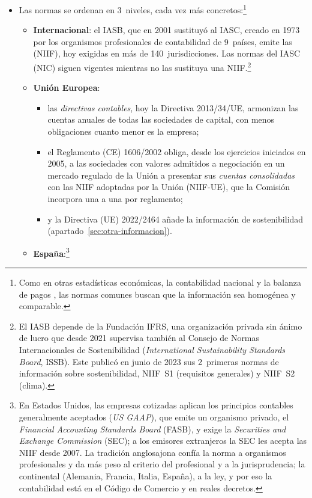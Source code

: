 \documentclass[11pt]{article}
\begin{document}
\begin{itemize}
\item Las normas se ordenan en 3~niveles, cada vez más concretos:\footnote{Como en otras estadísticas económicas, la contabilidad nacional  y la balanza de pagos , las normas comunes buscan que la información sea homogénea y comparable.}
  \begin{itemize}
  \item \textbf{Internacional}: el IASB, que en 2001 sustituyó al IASC, creado en 1973 por los organismos profesionales de contabilidad de 9~países, emite las  (NIIF), hoy exigidas en más de 140~jurisdicciones. Las normas del IASC (NIC) siguen vigentes mientras no las sustituya una NIIF\nocite{IFRS2026Quienes}.\footnote{El IASB depende de la Fundación IFRS, una organización privada sin ánimo de lucro que desde 2021 supervisa también al Consejo de Normas Internacionales de Sostenibilidad (\emph{International Sustainability Standards Board}, ISSB). Este publicó en junio de 2023 sus 2~primeras normas de información sobre sostenibilidad, NIIF~S1 (requisitos generales) y NIIF~S2 (clima)\nocite{ISSB2023S1S2}.}
  \item \textbf{Unión Europea}:
    \begin{itemize}
    \item las \emph{directivas contables}, hoy la Directiva 2013/34/UE, armonizan las cuentas anuales de todas las sociedades de capital, con menos obligaciones cuanto menor es la empresa\nocite{UE2013Directiva34};
    \item el Reglamento (CE) 1606/2002 obliga, desde los ejercicios iniciados en 2005, a las sociedades con valores admitidos a negociación en un mercado regulado de la Unión a presentar sus \emph{cuentas consolidadas} con las NIIF adoptadas por la Unión (NIIF-UE), que la Comisión incorpora una a una por reglamento\nocite{UE2002Reglamento1606};
    \item y la Directiva (UE) 2022/2464 añade la información de sostenibilidad (apartado~\ref{sec:otra-informacion})\nocite{UE2022CSRD}.
    \end{itemize}
  \item \textbf{España}:\footnote{En Estados Unidos, las empresas cotizadas aplican los principios contables generalmente aceptados (\emph{US GAAP}), que emite un organismo privado, el \emph{Financial Accounting Standards Board} (FASB), y exige la \emph{Securities and Exchange Commission} (SEC); a los emisores extranjeros la SEC les acepta las NIIF desde 2007. La tradición anglosajona confía la norma a organismos profesionales y da más peso al criterio del profesional y a la jurisprudencia; la continental (Alemania, Francia, Italia, España), a la ley, y por eso la contabilidad está en el Código de Comercio y en reales decretos.}

\end{itemize}
\end{itemize}
\end{document}
